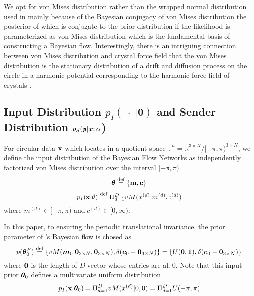 We opt for von Mises distribution rather than the wrapped normal distribution used in \citet{jiao2023crystal,jing2022torsional} mainly because of the Bayesian conjugacy of von Mises distribution the posterior of which is conjugate to the prior distribution if the likelihood is parameterized as von Mises distribution which is the fundamental basis of constructing a Bayesian flow. Interestingly, there is an intriguing connection between von Mises distribution and crystal force field that the von Mises distribution is the stationary distribution of a drift and diffusion process on the circle in a harmonic potential corresponding to the harmonic force field of crystals \citep{risken1996fokker}.
\subsection{Input Distribution \texorpdfstring{$p_I(\ \cdot\ |\bm{\theta})$}{} and Sender Distribution \texorpdfstring{$p_S({\bm{y}} | {\bm{x}};\alpha$)}{}}
For circular data $\bold{x}$ which locates in a quotient space $\mathbb{T}^n=\mathbb{R}^{3\times N}/[-\pi,\pi)^{3\times N}$, we define the input distribution of the Bayesian Flow Networks as independently factorized von Mises distribution over the interval $[-\pi,\pi)$.
\begin{equation}
    \bm{\theta} \stackrel{\text{def}}{=} \{\bold{m},\bold{c}\}
\end{equation}
\begin{equation}
    p_I( \bold{x} | \theta)\stackrel{\text{def}}{=}\Pi_{d=1}^D vM(x^{(d)}|m^{(d)},c^{(d)})
\end{equation}
where $m^{(d)}\in [-\pi,\pi)$ and $c^{(d)}\in [0,\infty)$. 


In this paper, to ensuring the periodic translational invariance, the prior parameter of \modelname's Bayesian flow is chosed as 
\begin{equation}
p(\bm{\theta}^F_0) \stackrel{\text{def}}{=} \{vM({\bm{m}}_0|\boldsymbol{0}_{3\times N},\boldsymbol{0}_{3\times N}),\delta({\bm{c}}_0-\boldsymbol{0}_{3\times N})\} = \{U(\boldsymbol{0},\boldsymbol{1}),\delta({\bm{c}}_0-\boldsymbol{0}_{3\times N})\}
\end{equation}
where $\bold{0}$ is the length of $D$ vector whose entries are all $0$. Note that this input prior $\bm{\theta}_0$ defines a multivariate uniform distribution
\begin{equation}
    p_I( \bold{x} | \bm{\theta}_0)=\Pi_{d=1}^D vM(x^{(d)}|0,0)=\Pi_{d=1}^D U(-\pi,\pi)
\end{equation}

